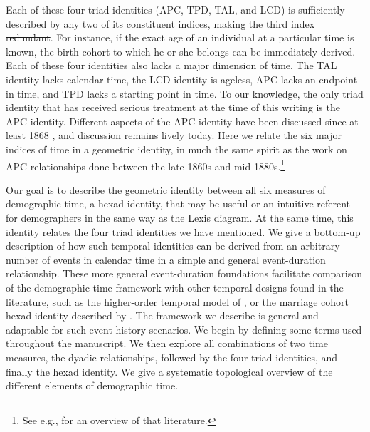 \documentclass[12pt,oneside,a4paper]{article} %
\theoremstyle{definition}
\begin{document}
Each of these four triad identities (APC, TPD, TAL, and LCD) is sufficiently
described by any two of its constituent indices\st{, making the third index
redundant}. For instance, if the exact age of an individual at a particular
time is known, the birth cohort to which he or she belongs can be immediately derived. Each of these four identities also lacks a major dimension of time. The TAL identity lacks calendar time, the LCD identity is ageless, APC lacks an endpoint in time, and TPD lacks a starting point in time.
To our knowledge, the only triad identity that has received serious
treatment at the time of this writing is the APC identity. Different
aspects of the APC identity have been discussed since at least 1868
\citep{knapp1868ermittlung}, and discussion remains lively today. Here we relate the six major indices of time in a geometric identity, in much the same spirit as the work on APC relationships done between the late
1860s and mid 1880s.\footnote{See e.g., \citet{keiding2011age} for an overview of that literature.} 

Our goal is to describe the geometric identity between all
six measures of demographic time, a hexad identity, that may be useful or an intuitive
referent for demographers in the same way as the Lexis diagram. At the same
time, this identity relates the four triad identities we have mentioned. We give a bottom-up
description of how such temporal identities can be derived from an
arbitrary number of events in calendar time in a simple and general
event-duration relationship. These more general event-duration foundations
facilitate comparison of the demographic time framework with other temporal designs found in the
literature, such as the higher-order temporal model of \citet{brinks2014lexis},
or the marriage cohort hexad identity described by \citet{lexis1875einleitung}.
The framework we describe is general and adaptable for such event history scenarios.
We begin by defining some terms used throughout the manuscript.
We then explore all combinations of two time measures, the dyadic relationships, followed by the four triad identities, and
finally the hexad identity. We give a systematic topological overview of the
different elements of demographic time. 
\end{document}
